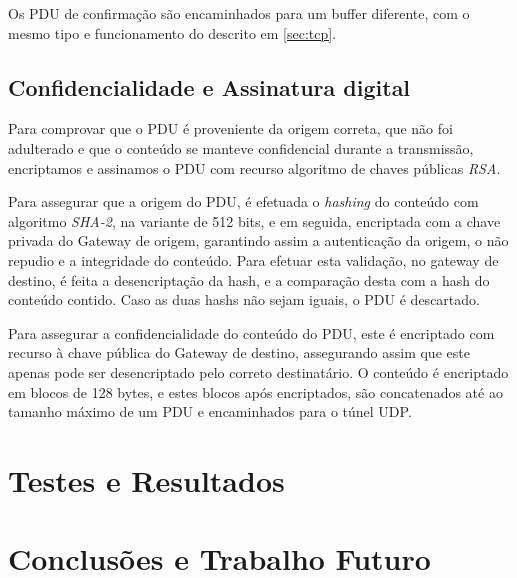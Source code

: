 \documentclass[a4paper]{report}
\begin{document}
Os PDU de confirmação são encaminhados para um buffer diferente, com o mesmo
tipo e funcionamento do descrito em \ref{sec:tcp}.

\section{Confidencialidade e Assinatura digital} \label{sec:auth}

Para comprovar que o PDU é proveniente da origem correta, que não foi
adulterado e que o conteúdo se manteve confidencial durante a transmissão,
encriptamos e assinamos o PDU com recurso algoritmo de chaves públicas 
\textit{RSA}. 

Para assegurar que a origem do PDU, é efetuada o \textit{hashing} do conteúdo
com algoritmo \textit{SHA-2}, na variante de 512 bits, e em seguida, encriptada
com a chave privada do Gateway de origem, garantindo assim a autenticação da
origem, o não repudio e a integridade do conteúdo. Para efetuar esta validação,
no gateway de destino, é feita a desencriptação da hash, e a comparação desta 
com a hash do conteúdo contido. Caso as duas hashs não sejam iguais, o PDU é
descartado.

Para assegurar a confidencialidade do conteúdo do PDU, este é encriptado com
recurso à chave pública do Gateway de destino, assegurando assim que este
apenas pode ser desencriptado pelo correto destinatário. O conteúdo é 
encriptado em blocos de 128 bytes, e estes blocos após encriptados, são
concatenados até ao tamanho máximo de um PDU e encaminhados para o túnel
UDP.

\chapter{Testes e Resultados}

\chapter{Conclusões e Trabalho Futuro}
\end{document}
